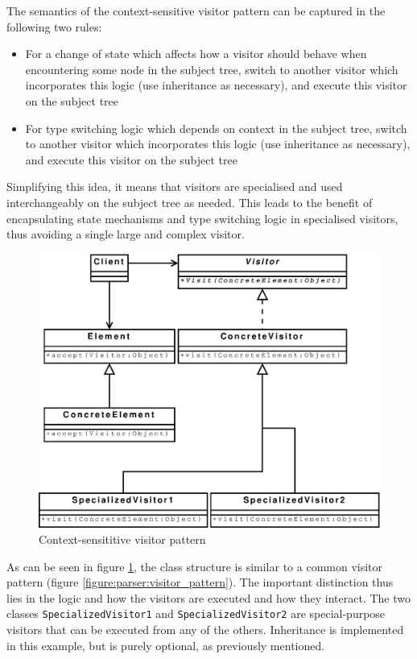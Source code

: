 The semantics of the context-sensitive visitor pattern can be captured in the
following two rules:
\begin{itemize}
  \item For a change of state which affects how a visitor should behave when
  encountering some node in the subject tree, switch to another visitor which
  incorporates this logic (use inheritance as necessary), and execute this
  visitor on the subject tree
  \item For type switching logic which depends on context in the subject tree,
  switch to another visitor which incorporates this logic (use inheritance as
  necessary), and execute this visitor on the subject tree
\end{itemize}

Simplifying this idea, it means that visitors are specialised and used
interchangeably on the subject tree as needed. This leads to the benefit of
encapsulating state mechanisms and type switching logic in specialised
visitors, thus avoiding a single large and complex visitor.

\begin{figure}[h]
  \centering
    \includegraphics[scale=0.40]{diagrams/context_visitor_pattern} 
  \caption{Context-sensititive visitor pattern}
  \label{figure:parser:context_visitor_pattern}
\end{figure}

As can be seen in figure \ref{figure:parser:context_visitor_pattern}, the
class structure is similar to a common visitor pattern (figure
\ref{figure:parser:visitor_pattern}). The important distinction thus lies in
the logic and how the visitors are executed and how they interact. The two
classes \verb!SpecializedVisitor1! and \verb!SpecializedVisitor2! are
special-purpose visitors that can be executed from any of the others.
Inheritance is implemented in this example, but is purely optional, as
previously mentioned.
